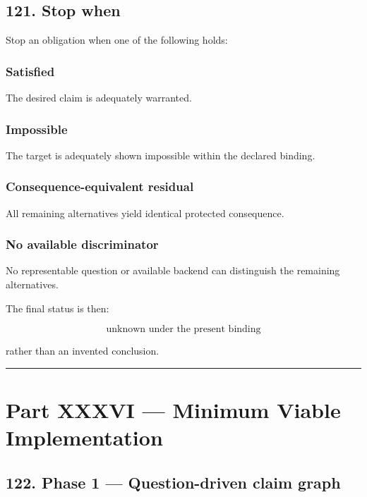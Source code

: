 \documentclass[
]{article}
\begin{document}
\subsection{121. Stop when}\label{stop-when}

Stop an obligation when one of the following holds:

\subsubsection{Satisfied}\label{satisfied}

The desired claim is adequately warranted.

\subsubsection{Impossible}\label{impossible}

The target is adequately shown impossible within the declared binding.

\subsubsection{Consequence-equivalent
residual}\label{consequence-equivalent-residual}

All remaining alternatives yield identical protected consequence.

\subsubsection{No available
discriminator}\label{no-available-discriminator}

No representable question or available backend can distinguish the
remaining alternatives.

The final status is then:

\[
\boxed{
\text{unknown under the present binding}
}
\]

rather than an invented conclusion.

\begin{center}\rule{0.5\linewidth}{0.5pt}\end{center}

\section{Part XXXVI --- Minimum Viable
Implementation}\label{part-xxxvi-minimum-viable-implementation}

\subsection{122. Phase 1 --- Question-driven claim
graph}\label{phase-1-question-driven-claim-graph}
\end{document}
